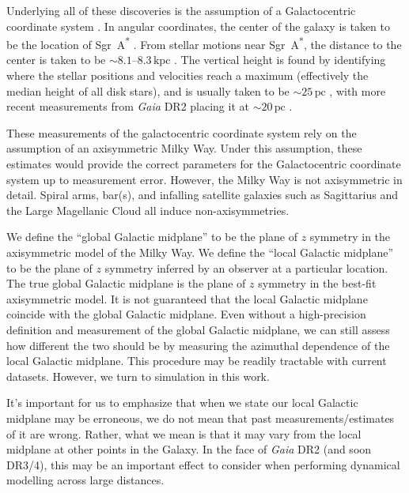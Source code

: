 \documentclass[twocolumn]{aastex62}
\newcommand{\pc}{\text{pc}}
\newcommand{\kpc}{\text{kpc}}
\begin{document}
Underlying all of these discoveries is the assumption of a Galactocentric
coordinate system \citep{2008gady.book.....B}. In angular
coordinates, the center of the galaxy is taken to be the location of
Sgr~A\textsuperscript{*} \citep[e.g.][]{2004ApJ...616..872R}. From stellar
motions near Sgr~A\textsuperscript{*}, the distance to the center is taken to
be $\sim 8.1\text{--}8.3\,\kpc$
\citep{2009ApJ...692.1075G,2018A&A...615L..15G}. The vertical height is found
by identifying where the stellar positions and velocities reach a maximum
(effectively the median height of all disk stars), and is usually taken to be
$\sim 25\,\pc$ \citep{2001ApJ...553..184C}, with more recent measurements from
{\em Gaia} DR2 placing it at $\sim 20\,\pc$ \citep{2019MNRAS.482.1417B}.

These measurements of the galactocentric coordinate system rely on the
assumption of an axisymmetric Milky Way. Under this assumption, these
estimates would provide the correct parameters for the Galactocentric
coordinate system up to measurement error. However, the Milky Way is not
axisymmetric in detail. Spiral arms, bar(s), and infalling satellite galaxies
such as Sagittarius and the Large Magellanic Cloud all induce
non-axisymmetries.

We define the ``global Galactic midplane'' to be the plane of $z$ symmetry in
the axisymmetric model of the Milky Way. We define the ``local Galactic
midplane'' to be the plane of $z$ symmetry inferred by an observer at a
particular location. The true global Galactic midplane is the plane of $z$
symmetry in the best-fit axisymmetric model. It is not guaranteed that the
local Galactic midplane coincide with the global Galactic midplane. Even
without a high-precision definition and measurement of the global Galactic
midplane, we can still assess how different the two should be by measuring the
azimuthal dependence of the local Galactic midplane. This procedure may be
readily tractable with current datasets. However, we turn to simulation in
this work.

It's important for us to emphasize that when we state our local Galactic
midplane may be erroneous, we do not mean that past measurements/estimates of
it are wrong. Rather, what we mean is that it may vary from the local midplane
at other points in the Galaxy. In the face of {\em Gaia} DR2 (and soon DR3/4),
this may be an important effect to consider when performing dynamical
modelling across large distances.
\end{document}
